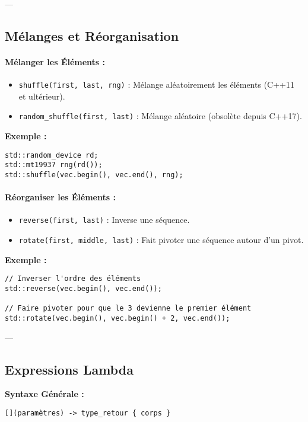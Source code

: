 ---

\subsection{ Mélanges et Réorganisation}
\paragraph{Mélanger les Éléments :}
\begin{itemize}
    \item \texttt{shuffle(first, last, rng)} : Mélange aléatoirement les éléments (C++11 et ultérieur).
    \item \texttt{random\_shuffle(first, last)} : Mélange aléatoire (obsolète depuis C++17).
\end{itemize}

\textbf{Exemple :}
\begin{tcolorbox}[colframe=blue!50!black, colback=blue!5!white, title=Exemple de Mélange]
\begin{verbatim}
std::random_device rd;
std::mt19937 rng(rd());
std::shuffle(vec.begin(), vec.end(), rng);
\end{verbatim}
\end{tcolorbox}

\paragraph{Réorganiser les Éléments :}
\begin{itemize}
    \item \texttt{reverse(first, last)} : Inverse une séquence.
    \item \texttt{rotate(first, middle, last)} : Fait pivoter une séquence autour d'un pivot.
\end{itemize}

\textbf{Exemple :}
\begin{tcolorbox}[colframe=blue!50!black, colback=blue!5!white, title=Exemple de Réorganisation]
\begin{verbatim}
// Inverser l'ordre des éléments
std::reverse(vec.begin(), vec.end());

// Faire pivoter pour que le 3 devienne le premier élément
std::rotate(vec.begin(), vec.begin() + 2, vec.end());
\end{verbatim}
\end{tcolorbox}

---

\subsection{ Expressions Lambda}
\textbf{Syntaxe Générale :}
\begin{tcolorbox}[colframe=blue!50!black, colback=blue!5!white, title=Syntaxe Générale des Lambdas]
\begin{verbatim}
[](paramètres) -> type_retour { corps }
\end{verbatim}
\end{tcolorbox}

